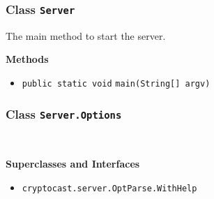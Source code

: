 \subsubsection{Class \lstinline|Server|}
The main method to start the server. \\
\noindent\begin{minipage}[t]{5cm}
\vspace{0.3em}
\hspace*{2em}
\vspace{0.3em}
\end{minipage}





\textbf{\sffamily Methods}
\begin{itemize}
\item \lstinline|public static void| \lstinline|main|\lstinline|(String[] argv)| \\[-0.6em]




\end{itemize}

\subsubsection{Class \lstinline|Server.Options|}
 \\
\noindent\begin{minipage}[t]{5cm}
\vspace{0.3em}
\hspace*{2em}
\vspace{0.3em}
\end{minipage}



\textbf{\sffamily Superclasses and Interfaces}
\begin{itemize}
\item \lstinline|cryptocast.server.OptParse.WithHelp|
\end{itemize}



